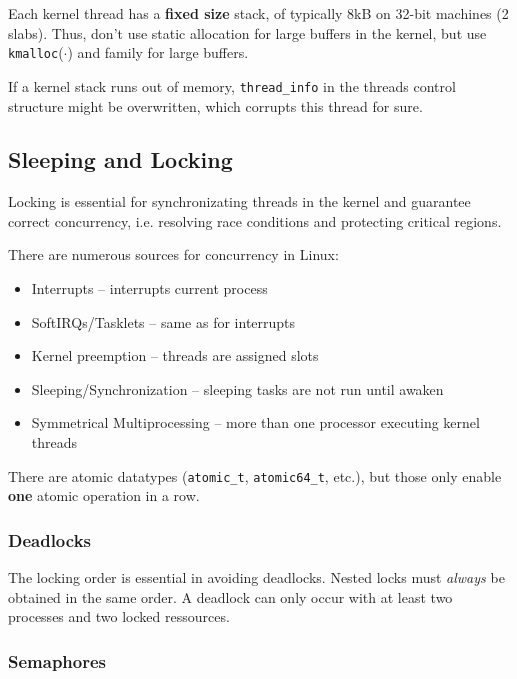 \documentclass[english]{panikzettel}
\newcommand{\fkt}[1]{\texttt{#1}(\(\cdot\))}
\begin{document}
	Each kernel thread has a \textbf{fixed size} stack, of typically 8kB on 32-bit machines (2 slabs).
	Thus, don't use static allocation for large buffers in the kernel, but use \fkt{kmalloc} and family for large buffers. 

	If a kernel stack runs out of memory, \texttt{thread\_info} in the threads control structure might be overwritten, which corrupts this thread for sure. 

	\subsection{Sleeping and Locking}
	\label{ss:kernel-networking:sleeping-and-locking}
	
	Locking is essential for synchronizating threads in the kernel and guarantee correct concurrency, i.e. resolving race conditions and protecting critical regions.	

	There are numerous sources for concurrency in Linux:
	\begin{itemize}
		\item Interrupts – interrupts current process
		\item SoftIRQs/Tasklets – same as for interrupts
		\item Kernel preemption – threads are assigned slots
		\item Sleeping/Synchronization – sleeping tasks are not run until awaken
		\item Symmetrical Multiprocessing – more than one processor executing kernel threads
	\end{itemize}

	There are atomic datatypes (\texttt{atomic\_t}, \texttt{atomic64\_t}, etc.), but those only enable \textbf{one} atomic operation in a row. 


	\subsubsection{Deadlocks}
	\label{sss:sleeping-and-locking:deadlocks}
	
	The locking order is essential in avoiding deadlocks.
	Nested locks must \textit{always} be obtained in the same order.
	A deadlock can only occur with at least two processes and two locked ressources.

	\subsubsection{Semaphores}
	\label{sss:sleeping-and-locking:semaphores}
	
\end{document}
